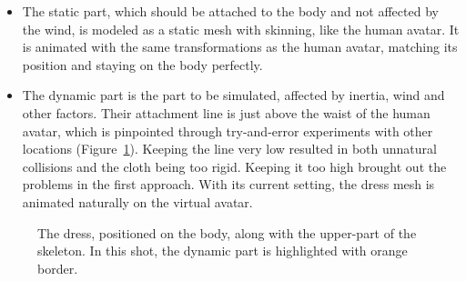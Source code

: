 \begin{itemize}
\item The static part, which should be attached to the body and not affected by the wind, is modeled as a static mesh with skinning, like the human avatar. It is animated with the same transformations as the human avatar, matching its position and staying on the body perfectly. 
\item The dynamic part is the part to be simulated, affected by inertia, wind and other factors. Their attachment line is just above the waist of the human avatar, which is pinpointed through try-and-error experiments with other locations (Figure~\ref{fig:dress_and_body}). Keeping the line very low resulted in both unnatural collisions and the cloth being too rigid. Keeping it too high brought out the problems in the first approach. With its current setting, the dress mesh is animated naturally on the virtual avatar.
\end{itemize}

\begin{figure}[ht]
\centerline{}
\caption{The dress, positioned on the body, along with the upper-part of the skeleton. In this shot, the dynamic part is highlighted with orange border.}
\label{fig:dress_and_body}
\end{figure}

